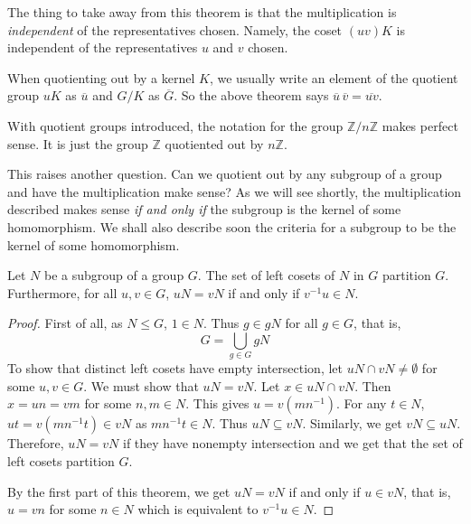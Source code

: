 The thing to take away from this theorem is that the multiplication is \textit{independent} of the representatives chosen. Namely, the coset $(uv)K$ is independent of the representatives $u$ and $v$ chosen.

When quotienting out by a kernel $K$, we usually write an element of the quotient group $uK$ as $\overline u$ and $G/K$ as $\overline G$. So the above theorem says $\overline u\,\overline v=\overline{uv}$.

With quotient groups introduced, the notation for the group $\mathbb{Z}/n\mathbb{Z}$ makes perfect sense. It is just the group $\mathbb{Z}$ quotiented out by $n\mathbb{Z}$.

\vspace{2mm}
This raises another question. Can we quotient out by any subgroup of a group and have the multiplication make sense? As we will see shortly, the multiplication described makes sense \textit{if and only if} the subgroup is the kernel of some homomorphism. We shall also describe soon the criteria for a subgroup to be the kernel of some homomorphism.

\begin{theorem}
\label{cosetsPartitionsGroup}
    Let $N$ be a subgroup of a group $G$. The set of left cosets of $N$ in $G$ partition $G$. Furthermore, for all $u,v\in G$, $uN=vN$ if and only if $v^{-1}u\in N$.
\end{theorem}
\begin{proof}
    First of all, as $N\leq G$, $1\in N$. Thus $g\in gN$ for all $g\in G$, that is,
    $$G=\bigcup_{g\in G}gN$$
    To show that distinct left cosets have empty intersection, let $uN\cap vN\neq\emptyset$ for some $u,v\in G$. We must show that $uN=vN$. Let $x\in uN\cap vN$. Then $x=un=vm$ for some $n,m\in N$. This gives $u=v(mn^{-1})$. For any $t\in N$, $ut=v(mn^{-1}t)\in vN$ as $mn^{-1}t\in N$. Thus $uN\subseteq vN$. Similarly, we get $vN\subseteq uN$. Therefore, $uN=vN$ if they have nonempty intersection and we get that the set of left cosets partition $G$.
    
    By the first part of this theorem, we get $uN=vN$ if and only if $u\in vN$, that is, $u=vn$ for some $n\in N$ which is equivalent to $v^{-1}u\in N$.
\end{proof}


